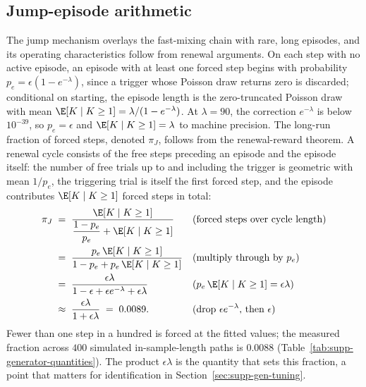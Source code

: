 \subsection{Jump-episode arithmetic}
\label{sec:supp-gen-renewal}

The jump mechanism overlays the fast-mixing chain with rare, long
episodes, and its operating characteristics follow from renewal
arguments. On each step with no active episode, an episode with at
least one forced step begins with probability
$p_e = \epsilon (1 - e^{-\lambda})$, since a trigger whose Poisson
draw returns zero is discarded; conditional on starting, the episode
length is the zero-truncated Poisson draw with mean
$\E[K \mid K \ge 1] = \lambda / (1 - e^{-\lambda})$. At $\lambda =
90$, the correction $e^{-\lambda}$ is below $10^{-39}$, so $p_e =
\epsilon$ and $\E[K \mid K \ge 1] = \lambda$ to machine precision.
The long-run fraction of forced steps, denoted $\pi_J$, follows from
the renewal-reward theorem. A renewal cycle consists of the free
steps preceding an episode and the episode itself: the number of free
trials up to and including the trigger is geometric with mean
$1/p_e$, the triggering trial is itself the first forced step, and
the episode contributes $\E[K \mid K \ge 1]$ forced steps in total:
\begin{align}
  \pi_J
   &\;=\; \frac{\E[K \mid K \ge 1]}
     {\dfrac{1 - p_e}{p_e} + \E[K \mid K \ge 1]}
     && \text{(forced steps over cycle length)} \notag \\
   &\;=\; \frac{p_e\, \E[K \mid K \ge 1]}
     {1 - p_e + p_e\, \E[K \mid K \ge 1]}
     && \text{(multiply through by $p_e$)} \notag \\
   &\;=\; \frac{\epsilon \lambda}
     {1 - \epsilon + \epsilon e^{-\lambda} + \epsilon \lambda}
     && \text{($p_e\, \E[K \mid K \ge 1] = \epsilon \lambda$)} \notag \\
   &\;\approx\; \frac{\epsilon \lambda}{1 + \epsilon \lambda}
     \;=\; 0.0089.
     && \text{(drop $\epsilon e^{-\lambda}$, then $\epsilon$)}
  \label{eq:supp-rho}
\end{align}
Fewer than one step in a hundred is forced at the fitted values; the
measured fraction across $400$ simulated in-sample-length paths is
$0.0088$ (Table~\ref{tab:supp-generator-quantities}). The product $\epsilon \lambda$ is the quantity that sets
this fraction, a point that matters for identification in
Section~\ref{sec:supp-gen-tuning}.

